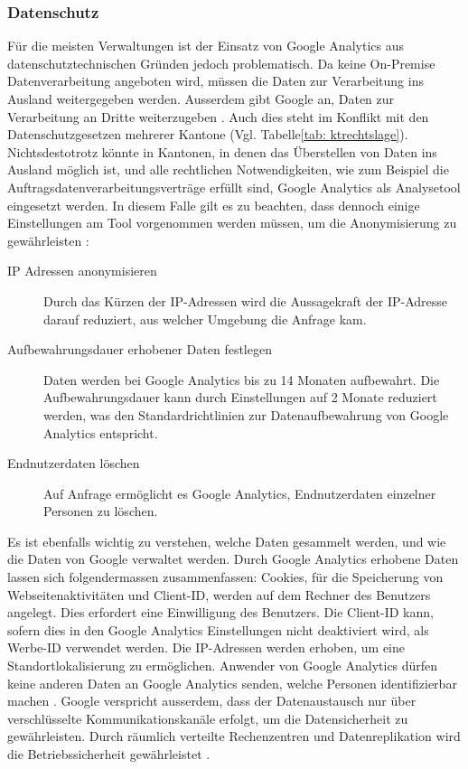 \subsubsection{Datenschutz}
Für die meisten Verwaltungen ist der Einsatz von Google Analytics aus datenschutztechnischen Gründen jedoch problematisch. Da keine On-Premise Datenverarbeitung angeboten wird, müssen die Daten zur Verarbeitung ins Ausland weitergegeben werden. Ausserdem gibt Google an, Daten zur Verarbeitung an Dritte weiterzugeben \parencite{GoogleInfoSharing}. Auch dies steht im Konflikt mit den Datenschutzgesetzen mehrerer Kantone (Vgl. Tabelle\ref{tab: ktrechtslage}). Nichtsdestotrotz könnte in Kantonen, in denen das Überstellen von Daten ins Ausland möglich ist, und alle rechtlichen Notwendigkeiten, wie zum Beispiel die Auftragsdatenverarbeitungsverträge erfüllt sind, Google Analytics als Analysetool eingesetzt werden. In diesem Falle gilt es zu beachten, dass dennoch einige Einstellungen am Tool vorgenommen werden müssen, um die Anonymisierung zu gewährleisten \parencite{GoogleAnalyticsDatenschutzEinstellungen}: 

\begin{description}
  \item[IP Adressen anonymisieren] Durch das Kürzen der IP-Adressen wird die Aussagekraft der IP-Adresse darauf reduziert, aus welcher Umgebung die Anfrage kam.
  \item[Aufbewahrungsdauer erhobener Daten festlegen] Daten werden bei Google Analytics bis zu 14 Monaten aufbewahrt. Die Aufbewahrungsdauer kann durch Einstellungen auf 2 Monate reduziert werden, was den Standardrichtlinien zur Datenaufbewahrung von Google Analytics entspricht.
  \item[Endnutzerdaten löschen] Auf Anfrage ermöglicht es Google Analytics, Endnutzerdaten einzelner Personen zu löschen.   
\end{description} 

Es ist ebenfalls wichtig zu verstehen, welche Daten gesammelt werden, und wie die Daten von Google verwaltet werden. Durch Google Analytics erhobene Daten lassen sich folgendermassen zusammenfassen: Cookies, für die Speicherung von Webseitenaktivitäten und Client-ID, werden auf dem Rechner des Benutzers angelegt. Dies erfordert eine Einwilligung des Benutzers. Die Client-ID kann, sofern dies in den Google Analytics Einstellungen nicht deaktiviert wird, als Werbe-ID verwendet werden. Die IP-Adressen werden erhoben, um eine Standortlokalisierung zu ermöglichen. Anwender von Google Analytics dürfen keine anderen Daten an Google Analytics senden, welche Personen identifizierbar machen \parencite{GoogleAnalyticsDatenschutz}. Google verspricht ausserdem, dass der Datenaustausch nur über verschlüsselte Kommunikationskanäle erfolgt, um die Datensicherheit zu gewährleisten. Durch räumlich verteilte Rechenzentren und Datenreplikation wird die Betriebssicherheit gewährleistet \parencite{GoogleAnalyticsDatenschutz}.

